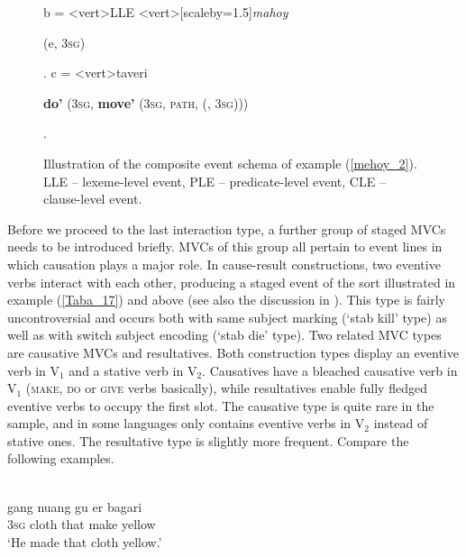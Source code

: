 \begin{figure}
\!b = <vert>{LLE}
<vert>[scaleby=1.5]{\textit{mahoy}}
{\begin{scriptsize} \textbf{} (e, 3\textsc{sg})\end{scriptsize}}.
\!c = <vert>{taveri}
{\begin{scriptsize} \textbf{do'} (3\textsc{sg}, \textbf{move'} (3\textsc{sg}, \textsc{path}, \textbf{} (, 3\textsc{sg}))) \end{scriptsize}}.
\endjtree

\caption[Event schema illustration of example (\ref{mehoy_2})]{Illustration of the composite event schema of example (\ref{mehoy_2}). LLE -- lexeme-level event, PLE -- predicate-level event, CLE -- clause-level event.}
\label{figure:eventschema_mehoy_2}
\end{figure}

Before we proceed to the last interaction type, a further group of staged MVCs needs to be introduced briefly. MVCs of this group all pertain to event lines in which causation plays a major role. In cause-result constructions, two eventive verbs interact with each other, producing a staged event of the sort illustrated in example (\ref{Taba_17}) and  above (see also the discussion in ). This type is fairly uncontroversial and occurs both with same subject marking (`stab kill' type) as well as with switch subject encoding (`stab die' type). Two related MVC types are causative MVCs and resultatives. Both construction types display an eventive verb in V$_1$ and a stative verb in V$_2$. Causatives have a bleached causative verb in V$_1$ (\textsc{make}, \textsc{do} or \textsc{give} verbs basically), while resultatives enable fully fledged eventive verbs to occupy the first slot. The causative type is quite rare in the sample, and in some languages only contains eventive verbs in V$_2$ instead of stative ones. The resultative type is slightly more frequent. Compare the following examples.

\ea \label{Kaera20}
\\
\gll gang nuang gu er bagari \\
3\textsc{sg} cloth that make yellow \\
\glft `He made that cloth yellow.' \\ 
\z

